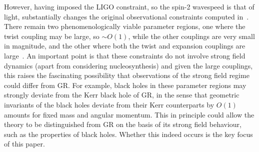 \documentclass[12pt]{article}
\numberwithin{equation}{section}
\begin{document}
However, having imposed the LIGO constraint, so the spin-2 wavespeed is that of light, substantially changes the original observational constraints computed in~\cite{Foster:2005dk}.
There remain two phenomenologically viable parameter regions, one where the twist coupling may be large, so $\sim O(1)$, while the other couplings are very small in magnitude, and the other where both the twist and expansion couplings are large~\cite{Oost:2018tcv}.
An important point is that these constraints do not involve strong field dynamics (apart from considering nucleosynthesis) and given the large couplings, this raises the fascinating possibility that observations of the strong field regime could differ from GR. For example, black holes in these parameter regions may strongly deviate from the Kerr black hole of GR, in the sense that geometric invariants of the black holes deviate from their Kerr counterparts by $O(1)$ amounts for fixed mass and angular momentum. This in principle could allow the theory to be distinguished from GR on the basis of its strong field behaviour, such as the properties of black holes. Whether this indeed occurs is the key focus of this paper.
\end{document}
